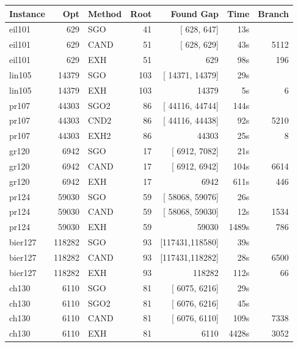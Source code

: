\documentclass[a4paper,11pt,twoside]{book}
\begin{document}
\begin{multicols}{2}
\vfill
\begin{center}
\small
\begin{tabular}{|lrlrrrr|}
\hline
{\bf Instance} & {\bf Opt} & {\bf Method} & {\bf Root} & {\bf Found Gap} & {\bf Time} & {\bf Branch} \\
\hline
\hline
eil101       &      629 &  SGO &  41 & [   628,   647] &    13s & \\
eil101       &      629 & CAND &  51 & [   628,   629] &    43s &    5112 \\
eil101       &      629 &  EXH &  51 &            629  &    98s &     196 \\
lin105       &    14379 &  SGO & 103 & [ 14371, 14379] &    29s & \\
lin105       &    14379 &  EXH & 103 &          14379  &     5s &       6 \\
pr107        &    44303 & SGO2 &  86 & [ 44116, 44744] &   144s &         \\
pr107        &    44303 & CND2 &  86 & [ 44116, 44438] &    92s &    5210 \\
pr107        &    44303 & EXH2 &  86 &          44303  &    25s &       8 \\
gr120        &     6942 &  SGO &  17 & [  6912,  7082] &    21s & \\
gr120        &     6942 & CAND &  17 & [  6912,  6942] &   104s &    6614 \\
gr120        &     6942 &  EXH &  17 &            6942 &   611s &     446 \\
pr124        &    59030 &  SGO &  59 & [ 58068, 59076] &    26s & \\
pr124        &    59030 & CAND &  59 & [ 58068, 59030] &    12s &    1534 \\
pr124        &    59030 &  EXH &  59 &           59030 &  1489s &     786 \\
bier127      &   118282 &  SGO &  93 & [117431,118580] &    39s & \\
bier127      &   118282 & CAND &  93 & [117431,118282] &    28s &    6500 \\
bier127      &   118282 &  EXH &  93 &          118282 &   112s &      66 \\
ch130        &     6110 &  SGO &  81 & [  6075,  6216] &    29s & \\
ch130        &     6110 & SGO2 &  81 & [  6076,  6216] &    45s & \\
ch130        &     6110 & CAND &  81 & [  6076,  6110] &   109s &    7338 \\
ch130        &     6110 &  EXH &  81 &           6110  &  4428s &    3052 \\

\end{tabular}
\end{center}
\end{multicols}
\end{document}

